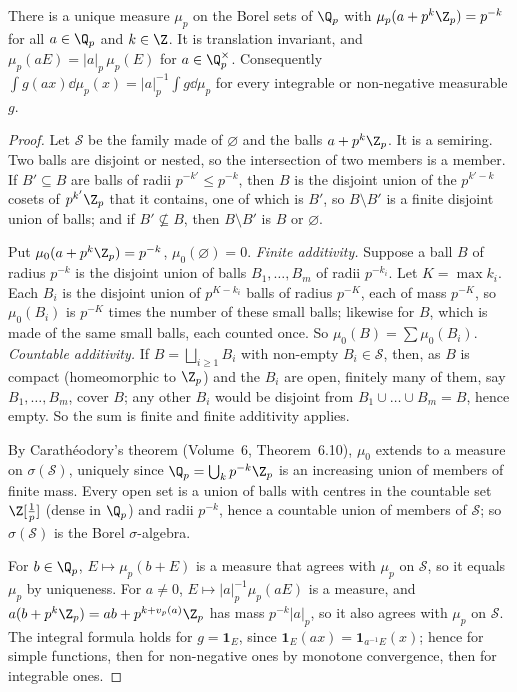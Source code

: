 \begin{proposition}\label{prop:haarQp}
There is a unique measure $\mu_p$ on the Borel sets of $\Q_p$ with $\mu_p(a+p^k\Z_p)=p^{-k}$ for all $a\in\Q_p$ and $k\in\Z$.
It is translation invariant, and $\mu_p(aE)=|a|_p\,\mu_p(E)$ for $a\in\Q_p^\times$. Consequently
$\int g(ax)\dd\mu_p(x)=|a|_p^{-1}\int g\dd\mu_p$ for every integrable or non-negative measurable $g$.
\end{proposition}
\begin{proof}
Let $\mathcal S$ be the family made of $\varnothing$ and the balls $a+p^k\Z_p$. It is a semiring. Two balls are disjoint or
nested, so the intersection of two members is a member. If $B'\subseteq B$ are balls of radii $p^{-k'}\le p^{-k}$, then $B$ is the
disjoint union of the $p^{k'-k}$ cosets of $p^{k'}\Z_p$ that it contains, one of which is $B'$, so $B\setminus B'$ is a finite disjoint
union of balls; and if $B'\not\subseteq B$, then $B\setminus B'$ is $B$ or $\varnothing$.

Put $\mu_0(a+p^k\Z_p)=p^{-k}$, $\mu_0(\varnothing)=0$. \emph{Finite additivity.} Suppose a ball $B$ of radius $p^{-k}$ is the disjoint
union of balls $B_1,\dots,B_m$ of radii $p^{-k_i}$. Let $K=\max k_i$. Each $B_i$ is the disjoint union of $p^{K-k_i}$ balls of radius
$p^{-K}$, each of mass $p^{-K}$, so $\mu_0(B_i)$ is $p^{-K}$ times the number of these small balls; likewise for $B$, which is made of
the same small balls, each counted once. So $\mu_0(B)=\sum\mu_0(B_i)$. \emph{Countable additivity.} If $B=\bigsqcup_{i\ge1}B_i$ with
non-empty $B_i\in\mathcal S$, then, as $B$ is compact (homeomorphic to $\Z_p$) and the $B_i$ are open, finitely many of them, say
$B_1,\dots,B_m$, cover $B$; any other $B_i$ would be disjoint from $B_1\cup\dots\cup B_m=B$, hence empty. So the sum is finite and
finite additivity applies.

By Carath\'eodory's theorem (Volume~6, Theorem~6.10), $\mu_0$ extends to a measure on $\sigma(\mathcal S)$, uniquely since
$\Q_p=\bigcup_kp^{-k}\Z_p$ is an increasing union of members of finite mass. Every open set is a union of balls with centres in the
countable set $\Z[\frac1p]$ (dense in $\Q_p$) and radii $p^{-k}$, hence a countable union of members of $\mathcal S$; so $\sigma(\mathcal S)$
is the Borel $\sigma$-algebra.

For $b\in\Q_p$, $E\mapsto\mu_p(b+E)$ is a measure that agrees with $\mu_p$ on $\mathcal S$, so it equals $\mu_p$ by uniqueness. For $a\ne0$,
$E\mapsto|a|_p^{-1}\mu_p(aE)$ is a measure, and $a(b+p^k\Z_p)=ab+p^{k+v_p(a)}\Z_p$ has mass $p^{-k}|a|_p$, so it also agrees with
$\mu_p$ on $\mathcal S$. The integral formula holds for $g=\mathbf 1_E$, since $\mathbf 1_E(ax)=\mathbf 1_{a^{-1}E}(x)$; hence for simple
functions, then for non-negative ones by monotone convergence, then for integrable ones.
\end{proof}

